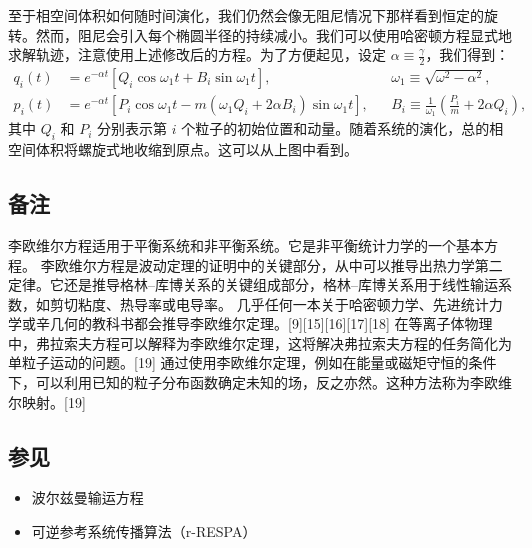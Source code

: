 至于相空间体积如何随时间演化，我们仍然会像无阻尼情况下那样看到恒定的旋转。然而，阻尼会引入每个椭圆半径的持续减小。我们可以使用哈密顿方程显式地求解轨迹，注意使用上述修改后的方程。为了方便起见，设定 \( \alpha \equiv \frac{\gamma}{2} \)，我们得到：
\[
\begin{aligned}
q_i(t) &= e^{-\alpha t} \left[ Q_i \cos \omega_1 t + B_i \sin \omega_1 t \right], && \omega_1 \equiv \sqrt{\omega^2 - \alpha^2}, \\
p_i(t) &= e^{-\alpha t} \left[ P_i \cos \omega_1 t - m(\omega_1 Q_i + 2 \alpha B_i) \sin \omega_1 t \right], && B_i \equiv \frac{1}{\omega_1} \left( \frac{P_i}{m} + 2 \alpha Q_i \right),
\end{aligned}~
\]
其中 \( Q_i \) 和 \( P_i \) 分别表示第 \( i \) 个粒子的初始位置和动量。随着系统的演化，总的相空间体积将螺旋式地收缩到原点。这可以从上图中看到。
\subsection{备注}  
李欧维尔方程适用于平衡系统和非平衡系统。它是非平衡统计力学的一个基本方程。  
李欧维尔方程是波动定理的证明中的关键部分，从中可以推导出热力学第二定律。它还是推导格林–库博关系的关键组成部分，格林–库博关系用于线性输运系数，如剪切粘度、热导率或电导率。  
几乎任何一本关于哈密顿力学、先进统计力学或辛几何的教科书都会推导李欧维尔定理。[9][15][16][17][18]  
在等离子体物理中，弗拉索夫方程可以解释为李欧维尔定理，这将解决弗拉索夫方程的任务简化为单粒子运动的问题。[19] 通过使用李欧维尔定理，例如在能量或磁矩守恒的条件下，可以利用已知的粒子分布函数确定未知的场，反之亦然。这种方法称为李欧维尔映射。[19]
\subsection{参见}  
\begin{itemize}
\item 波尔兹曼输运方程  
\item 可逆参考系统传播算法（r-RESPA）
\end{itemize}